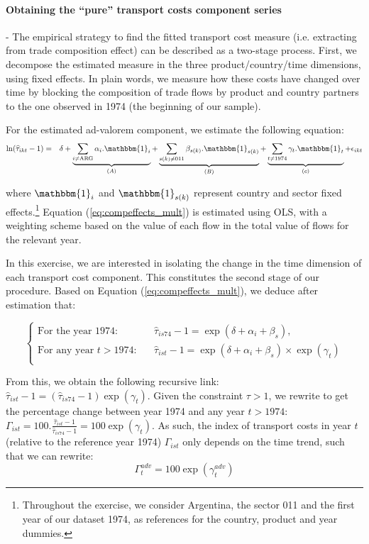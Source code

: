 \documentclass[a4paper,11pt]{article}
\begin{document}
\paragraph{Obtaining the ``pure'' transport costs component series} - The empirical strategy to find the fitted transport cost measure (i.e. extracting from trade composition effect) can be described as a two-stage process.
First, we decompose the estimated measure in the three product/country/time dimensions, using fixed effects. In plain words, we measure how these costs have changed over time by blocking the composition of trade flows by product and country partners to the one observed in 1974 (the beginning of our sample).\smallskip

For the estimated ad-valorem component, we estimate the following equation:
\begin{eqnarray}
\ln(\widehat{\tau}_{ikt}-1)&=&\delta +\underbrace{\sum_{i \neq \text{ARG}}\alpha_i.\mathbbm{1}_i}_{(A)} + \underbrace{\sum_{s(k)\neq \text{011}}\beta_{s(k)}.\mathbbm{1}_{s(k)}}_{(B)} + \underbrace{\sum_{t \neq 1974}\gamma_t.\mathbbm{1}_t}_{(c)}+\epsilon_{ikt} \label{eq:compeffects_mult}
\end{eqnarray}

\noindent where $\mathbbm{1}_i$ and $\mathbbm{1}_{s(k)}$ represent country and sector fixed effects.\footnote{Throughout the exercise, we consider Argentina, the sector 011 and the first year of our dataset 1974, as references for the country, product and year dummies.}  Equation (\ref{eq:compeffects_mult}) is estimated using OLS, with a weighting scheme based on the value of each flow in the total value of flows for the relevant year.

In this exercise, we are interested in isolating the change in the time dimension of each transport cost component. This constitutes the second stage of our procedure. Based on Equation (\ref{eq:compeffects_mult}), we deduce after estimation that:

\[\left\{
  \begin{array}{lcl}
  \text{For the year 1974:} &&  \widehat{\tau}_{is74} -1 = \exp(\delta +\alpha_i+\beta_s), \\
  \text{For any year }t> 1974:&& \widehat{\tau}_{ist} -1 = \exp(\delta +\alpha_i+\beta_s)\times \exp(\gamma_t) \\
  \end{array}
\right.\]

From this, we obtain the following recursive link: $\widehat{\tau}_{ist} -1 = (\widehat{\tau}_{is74}-1)\exp(\gamma_t)$. Given the constraint $\tau>1$, we rewrite to get the percentage change between year 1974 and any year $t>1974$: $\Gamma_{ist} = 100.\frac{\widehat{\tau}_{ist}-1}{\widehat{\tau}_{is74}-1}  = 100\exp(\gamma_t)$. As such, the index of transport costs in year $t$ (relative to the reference year 1974) $\Gamma_{ist} $  only depends on the time trend, such that we can rewrite:
\begin{equation}
 \Gamma^{adv}_t= 100\exp(\gamma^{adv}_t)  \label{eq:tcadv_compoeffect}
\end{equation}
\end{document}
